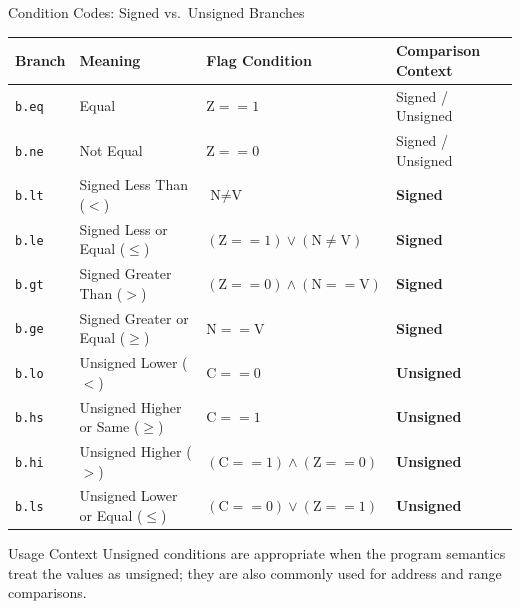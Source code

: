 \documentclass[aspectratio=169,11pt,t]{beamer}
\newcommand{\key}[1]{\textbf{#1}}
\newcommand{\code}[1]{\texttt{#1}}
\begin{document}
\begin{frame}{Condition Codes: Signed vs.\ Unsigned Branches}
\vspace{-0.35cm}
\begin{center}
\small
\setlength{\tabcolsep}{6pt}
\begin{tabular}{llll}
\toprule
\textbf{Branch} & \textbf{Meaning} & \textbf{Flag Condition} & \textbf{Comparison Context} \\
\midrule
\code{b.eq} & Equal                     & $\text{Z} == 1$           & Signed / Unsigned \\
\code{b.ne} & Not Equal                 & $\text{Z} == 0$           & Signed / Unsigned \\
\midrule
\code{b.lt} & Signed Less Than ($<$)    & $\text{N} \neq \text{V}$  & \key{Signed} \\
\code{b.le} & Signed Less or Equal ($\le$) & $(\text{Z} == 1) \lor (\text{N} \neq \text{V})$ & \key{Signed} \\
\code{b.gt} & Signed Greater Than ($>$) & $(\text{Z} == 0) \land (\text{N} == \text{V})$ & \key{Signed} \\
\code{b.ge} & Signed Greater or Equal ($\ge$) & $\text{N} == \text{V}$ & \key{Signed} \\
\midrule
\code{b.lo} & Unsigned Lower ($<$)      & $\text{C} == 0$           & \key{Unsigned} \\
\code{b.hs} & Unsigned Higher or Same ($\ge$) & $\text{C} == 1$      & \key{Unsigned} \\
\code{b.hi} & Unsigned Higher ($>$)     & $(\text{C} == 1) \land (\text{Z} == 0)$ & \key{Unsigned} \\
\code{b.ls} & Unsigned Lower or Equal ($\le$) & $(\text{C} == 0) \lor (\text{Z} == 1)$ & \key{Unsigned} \\
\bottomrule
\end{tabular}
\end{center}

\vspace{-0.35cm}
\normalsize
\begin{block}{Usage Context}
Unsigned conditions are appropriate when the program semantics treat the values as unsigned; they are also commonly used for address and range comparisons.
\end{block}
\end{frame}


\end{document}
